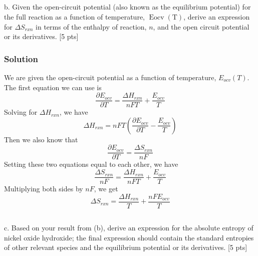\documentclass[12pt]{article}
\begin{document}
\subsection{}
b. Given the open-circuit potential (also known as the equilibrium potential) for the full reaction as a function of temperature, $\operatorname{Eocv}(\mathrm{T})$, derive an expression for $\Delta S_{r x n}$ in terms of the enthalpy of reaction, $n$, and the open circuit potential or its derivatives. [5 pts]\\[0pt]
\subsubsection{Solution}
We are given the open-circuit potential as a function of temperature, $E_{ocv}(T)$. The first equation we can use is
\begin{equation}
    \frac{\partial E_{ocv}}{\partial T} = \frac{\Delta H_{rxn}}{nFT} + \frac{E_{ocv}}{T}
\end{equation}
Solving for $\Delta H_{rxn}$, we have
\begin{equation}
    \Delta H_{rxn} = nFT \left( \frac{\partial E_{ocv}}{\partial T} - \frac{E_{ocv}}{T} \right)
\label{deltaH}
\end{equation}
Then we also know that
\begin{equation}
    \frac{\partial E_{ocv}}{\partial T} = \frac{\Delta S_{rxn}}{nF}
\end{equation}
Setting these two equations equal to each other, we have
\begin{equation}
    \frac{\Delta S_{rxn}}{nF} = \frac{\Delta H_{rxn}}{nFT} + \frac{E_{ocv}}{T}
\end{equation}
Multiplying both sides by $nF$, we get
\begin{equation}
    \Delta S_{rxn} = \frac{\Delta H_{rxn}}{T} + \frac{nFE_{ocv}}{T}
\end{equation}
\subsection{}
c. Based on your result from (b), derive an expression for the absolute entropy of nickel oxide hydroxide; the final expression should contain the standard entropies of other relevant species and the equilibrium potential or its derivatives. [5 pts]\\
\end{document}

